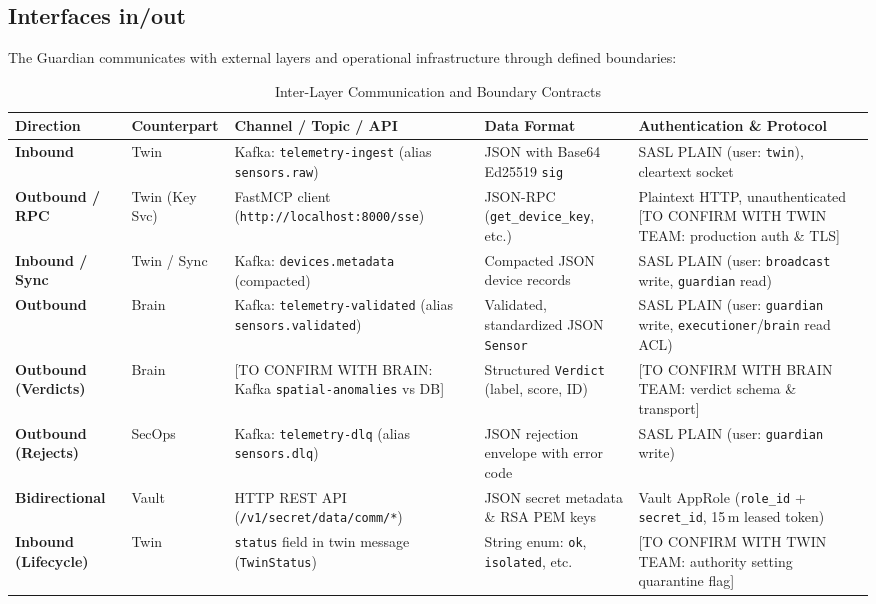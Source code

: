 \documentclass[11pt,a4paper]{article}
\begin{document}
\subsection{Interfaces in/out}
The Guardian communicates with external layers and operational infrastructure through defined boundaries:

\begin{table}[H]
\centering
\scriptsize
\renewcommand{\arraystretch}{0.98}
\caption{Inter-Layer Communication and Boundary Contracts}
\label{tab:interfaces}
\begin{tabularx}{\textwidth}{p{1.4cm}p{1.7cm}p{3.6cm}p{3.0cm}X}
\toprule
\textbf{Direction} & \textbf{Counterpart} & \textbf{Channel / Topic / API} & \textbf{Data Format} & \textbf{Authentication \& Protocol} \\
\midrule
\textbf{Inbound} & Twin & Kafka: \texttt{telemetry-ingest} (alias \texttt{sensors.raw}) & JSON with Base64 Ed25519 \texttt{sig} & SASL PLAIN (user: \texttt{twin}), cleartext socket \\
\textbf{Outbound / RPC} & Twin (Key Svc) & FastMCP client (\texttt{http://localhost:8000/sse}) & JSON-RPC (\texttt{get\_device\_key}, etc.) & Plaintext HTTP, unauthenticated [TO CONFIRM WITH TWIN TEAM: production auth \& TLS] \\
\textbf{Inbound / Sync} & Twin / Sync & Kafka: \texttt{devices.metadata} (compacted) & Compacted JSON device records & SASL PLAIN (user: \texttt{broadcast} write, \texttt{guardian} read) \\
\textbf{Outbound} & Brain & Kafka: \texttt{telemetry-validated} (alias \texttt{sensors.validated}) & Validated, standardized JSON \texttt{Sensor} & SASL PLAIN (user: \texttt{guardian} write, \texttt{executioner}/\texttt{brain} read ACL) \\
\textbf{Outbound (Verdicts)} & Brain & [TO CONFIRM WITH BRAIN: Kafka \texttt{spatial-anomalies} vs DB] & Structured \texttt{Verdict} (label, score, ID) & [TO CONFIRM WITH BRAIN TEAM: verdict schema \& transport] \\
\textbf{Outbound (Rejects)} & SecOps & Kafka: \texttt{telemetry-dlq} (alias \texttt{sensors.dlq}) & JSON rejection envelope with error code & SASL PLAIN (user: \texttt{guardian} write) \\
\textbf{Bidirectional} & Vault & HTTP REST API (\texttt{/v1/secret/data/comm/*}) & JSON secret metadata \& RSA PEM keys & Vault AppRole (\texttt{role\_id} + \texttt{secret\_id}, 15\,m leased token) \\
\textbf{Inbound (Lifecycle)} & Twin & \texttt{status} field in twin message (\texttt{TwinStatus}) & String enum: \texttt{ok}, \texttt{isolated}, etc. & [TO CONFIRM WITH TWIN TEAM: authority setting quarantine flag] \\

\end{tabularx}
\end{table}
\end{document}
